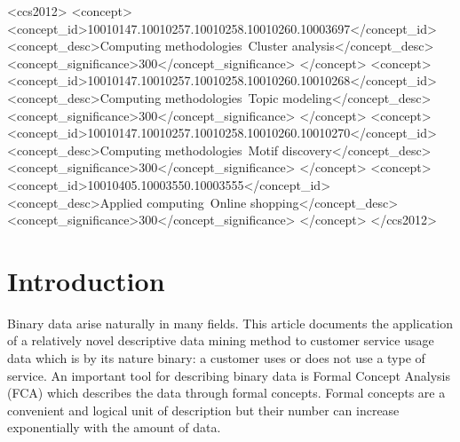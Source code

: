 \documentclass[acmconf,authordraft]{acmart}
\begin{document}
\begin{CCSXML}
<ccs2012>
<concept>
<concept_id>10010147.10010257.10010258.10010260.10003697</concept_id>
<concept_desc>Computing methodologies~Cluster analysis</concept_desc>
<concept_significance>300</concept_significance>
</concept>
<concept>
<concept_id>10010147.10010257.10010258.10010260.10010268</concept_id>
<concept_desc>Computing methodologies~Topic modeling</concept_desc>
<concept_significance>300</concept_significance>
</concept>
<concept>
<concept_id>10010147.10010257.10010258.10010260.10010270</concept_id>
<concept_desc>Computing methodologies~Motif discovery</concept_desc>
<concept_significance>300</concept_significance>
</concept>
<concept>
<concept_id>10010405.10003550.10003555</concept_id>
<concept_desc>Applied computing~Online shopping</concept_desc>
<concept_significance>300</concept_significance>
</concept>
</ccs2012>
\end{CCSXML}







\maketitle

\section{Introduction}

Binary data arise naturally in many fields. This article documents the application of a relatively novel descriptive data mining method to customer  service usage data which is by its nature binary: a customer uses or does not use a type of service.  An important tool for describing binary data is Formal Concept Analysis (FCA) which describes the data through formal concepts. Formal concepts are a convenient and logical unit of description but their number can increase exponentially with the amount of data.
\end{document}
